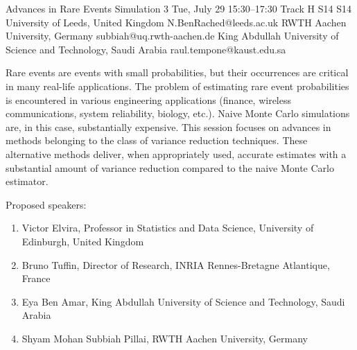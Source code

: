 \begin{talk}
  {Advances in Rare Events Simulation}%
  {3}%
  {}%
  {}%
  {}%
  {}%
  {Tue, July 29 15:30–17:30 Track H}%
  {S14}%
  {S14}%
  {%
    {University of Leeds, United Kingdom}%
    {N.BenRached@leeds.ac.uk}}%
  {%
	{RWTH Aachen University, Germany}%
	{subbiah@uq.rwth-aachen.de}}%
  {%
	{King Abdullah University of Science and Technology, Saudi Arabia}%
	{raul.tempone@kaust.edu.sa}}%

Rare events are events with small probabilities, but their occurrences are critical in many real-life applications. The problem of estimating rare event probabilities is encountered in various engineering applications (finance, wireless communications, system reliability, biology, etc.). Naive Monte Carlo simulations are, in this case, substantially expensive. This session focuses on advances in methods belonging to the class of variance reduction techniques.  These alternative methods deliver, when appropriately used, accurate estimates with a substantial amount of variance reduction compared to the naive Monte Carlo estimator. 

Proposed speakers:

\begin{enumerate}
	\item Victor Elvira, Professor in Statistics and Data Science, University of Edinburgh, United Kingdom
	\item Bruno Tuffin, Director of Research, INRIA Rennes-Bretagne Atlantique, France
	\item Eya Ben Amar, King Abdullah University of Science and Technology, Saudi Arabia
	\item Shyam Mohan Subbiah Pillai, RWTH Aachen University, Germany
\end{enumerate}

\medskip
%
%


\end{talk}
